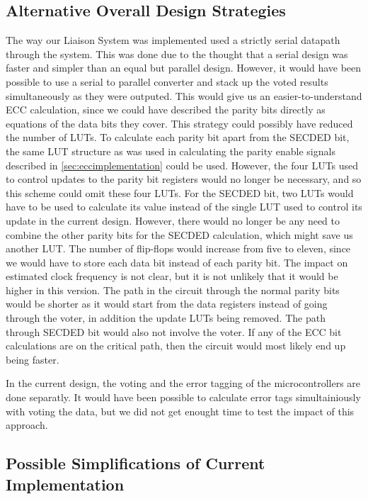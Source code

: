 \subsection{Alternative Overall Design Strategies}
\label{sec:alternativeoveralldesign}
The way our Liaison System was implemented used a strictly serial
datapath through the system. This was done due to the thought that a
serial design was faster and simpler than an equal but parallel
design. However, it would have been possible to use a serial to
parallel converter and stack up the voted results simultaneously as
they were outputed. This would give us an easier-to-understand ECC
calculation, since we could have described the parity bits directly as
equations of the data bits they cover. This strategy could possibly
have reduced the number of LUTs. To calculate each parity bit apart
from the SECDED bit, the same LUT structure as was used in calculating
the parity enable signals described in \autoref{sec:eccimplementation}
could be used. However, the four LUTs used to control updates to the
parity bit registers would no longer be necessary, and so this scheme
could omit these four LUTs. For the SECDED bit, two LUTs would have to
be used to calculate its value instead of the single LUT used to
control its update in the current design. However, there would no
longer be any need to combine the other parity bits for the SECDED
calculation, which might save us another LUT. The number of flip-flops
would increase from five to eleven, since we would have to store each
data bit instead of each parity bit. The impact on estimated clock
frequency is not clear, but it is not unlikely that it would be higher
in this version. The path in the circuit through the normal parity
bits would be shorter as it would start from the data registers
instead of going through the voter, in addition the update LUTs being
removed. The path through SECDED bit would also not involve the
voter. If any of the ECC bit calculations are on the critical path,
then the circuit would most likely end up being faster.

In the current design, the voting and the error tagging of the
microcontrollers are done separatly. It would have been possible to
calculate error tags simultainiously with voting the data, but we did
not get enought time to test the impact of this approach.

\subsection{Possible Simplifications of Current Implementation}

